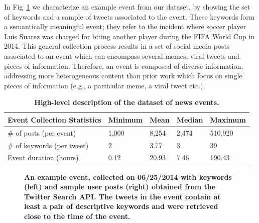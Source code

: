 \documentclass[10pt,letterpaper]{article}
\begin{document}
In Fig~\ref{fig:fig2} we characterize an example event from our
dataset, by showing the set of keywords and a sample of tweets
associated to the event. These keywords form a semantically meaningful
event; they refer to the incident where soccer player Luis Suarez was
charged for biting another player during the FIFA World Cup in
2014. This general collection process results in a set of social media
posts associated to an event which can encompass several memes, viral
tweets and pieces of information. Therefore, an event is composed of
diverse information, addressing more heterogeneous content than prior
work
\cite{Castillo:2014,Szabo:2010,Lerman:2010,Tatar:2011,Pinto:2013,Ahmed:2013,suh2010want}
which focus on single pieces of information (e.g., a
particular meme, a viral tweet etc.).
\begin{table}[!htb]
  \centering
  \begin{tabularx}{\textwidth}{@{}p{6cm}llll@{}}
    \toprule
    \textbf{Event Collection Statistics} & \textbf{Minimum} & \textbf{Mean} & \textbf{Median} & \textbf{Maximum} \\ \midrule
    \# of posts (per event) & 1,000 & 8,254 & 2,474 & 510,920 \\
    \# of keywords (per tweet) & 2 & 3.77 & 3 & 39 \\
    Event duration (hours) & 0.12 & 20.93 & 7.46 & 190.43 \\ \bottomrule
  \end{tabularx}
  \caption{\bf High-level description of the dataset of news events.} \label{table:dataset-stats}
\end{table}

\begin{figure}[!htb]
  \caption{\textbf{An example event, collected on 06/25/2014
      with keywords (left) and sample user posts (right) obtained
      from the Twitter Search API. The tweets in the event contain at
      least a pair of descriptive keywords and were retrieved close to the time
      of the event.}}
  \label{fig:fig2}
\end{figure}
\end{document}
